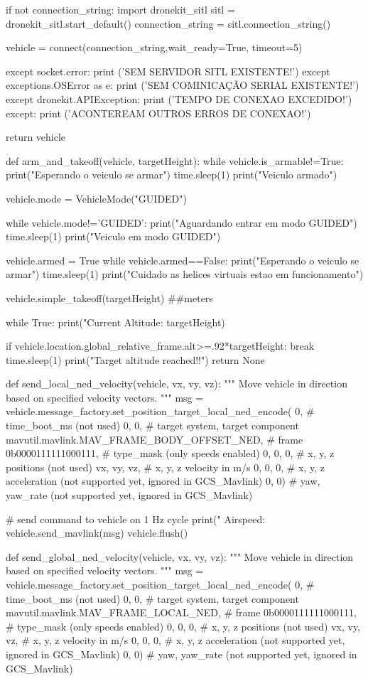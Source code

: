 \begin{apendicesenv}
\begin{python_}
		if not connection_string:
			import dronekit_sitl
			sitl = dronekit_sitl.start_default()
			connection_string = sitl.connection_string()
		
		vehicle = connect(connection_string,wait_ready=True, timeout=5)
	
	except socket.error:
		print ('SEM SERVIDOR SITL EXISTENTE!')
	except exceptions.OSError as e:
		print ('SEM COMINICAÇÃO SERIAL EXISTENTE!')
	except dronekit.APIException:
		print ('TEMPO DE CONEXAO EXCEDIDO!')
	except:
		print ('ACONTEREAM OUTROS ERROS DE CONEXAO!')
	
	return vehicle

def arm_and_takeoff(vehicle, targetHeight):
	while vehicle.is_armable!=True:
		print("Esperando o veiculo se armar")
		time.sleep(1)
	print("Veiculo armado")
	
	vehicle.mode = VehicleMode("GUIDED")
	
	while vehicle.mode!='GUIDED':
		print("Aguardando entrar em modo GUIDED")
		time.sleep(1)
	print("Veiculo em modo GUIDED")
	
	vehicle.armed = True
	while vehicle.armed==False:
		print("Esperando o veiculo se armar")
		time.sleep(1)
	print("Cuidado as helices virtuais estao em funcionamento")
	
	vehicle.simple_takeoff(targetHeight) ##meters
	
	
	while True:
		print("Current Altitude: %
		targetHeight)
		
		if vehicle.location.global_relative_frame.alt>=.92*targetHeight:
		break
		time.sleep(1)
	print("Target altitude reached!!")
	return None

def send_local_ned_velocity(vehicle, vx, vy, vz):
	"""
	Move vehicle in direction based on specified velocity vectors.
	"""
	msg = vehicle.message_factory.set_position_target_local_ned_encode(
		0,       # time_boot_ms (not used)
		0, 0,    # target system, target component
		mavutil.mavlink.MAV_FRAME_BODY_OFFSET_NED, # frame
		0b0000111111000111, # type_mask (only speeds enabled)
		0, 0, 0, # x, y, z positions (not used)
		vx, vy, vz, # x, y, z velocity in m/s
		0, 0, 0, # x, y, z acceleration (not supported yet, ignored in GCS_Mavlink)
		0, 0)    # yaw, yaw_rate (not supported yet, ignored in GCS_Mavlink)
	
	# send command to vehicle on 1 Hz cycle
	print(" Airspeed: %
	vehicle.send_mavlink(msg)
	vehicle.flush()


def send_global_ned_velocity(vehicle, vx, vy, vz):
	"""
	Move vehicle in direction based on specified velocity vectors.
	"""
	msg = vehicle.message_factory.set_position_target_local_ned_encode(
		0,       # time_boot_ms (not used)
		0, 0,    # target system, target component
		mavutil.mavlink.MAV_FRAME_LOCAL_NED, # frame
		0b0000111111000111, # type_mask (only speeds enabled)
		0, 0, 0, # x, y, z positions (not used)
		vx, vy, vz, # x, y, z velocity in m/s
		0, 0, 0, # x, y, z acceleration (not supported yet, ignored in GCS_Mavlink)
		0, 0)    # yaw, yaw_rate (not supported yet, ignored in GCS_Mavlink)
	

\end{python_}
\end{apendicesenv}
